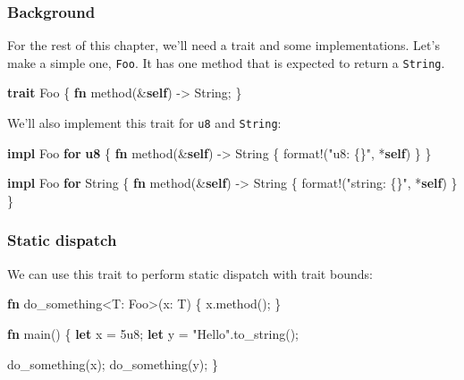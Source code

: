 \documentclass[a4paper,]{book}
\newenvironment{Shaded}{\begin{snugshade}}{\end{snugshade}}
\newcommand{\KeywordTok}[1]{\textcolor[rgb]{0.13,0.29,0.53}{\textbf{{#1}}}}
\newcommand{\DecValTok}[1]{\textcolor[rgb]{0.00,0.00,0.81}{{#1}}}
\newcommand{\StringTok}[1]{\textcolor[rgb]{0.31,0.60,0.02}{{#1}}}
\newcommand{\OtherTok}[1]{\textcolor[rgb]{0.56,0.35,0.01}{{#1}}}
\newcommand{\NormalTok}[1]{{#1}}
\begin{document}
\subsubsection{Background}\label{background}

For the rest of this chapter, we'll need a trait and some
implementations. Let's make a simple one, \texttt{Foo}. It has one
method that is expected to return a \texttt{String}.

\begin{Shaded}
\begin{Highlighting}[]
\KeywordTok{trait} \NormalTok{Foo \{}
    \KeywordTok{fn} \NormalTok{method(&}\KeywordTok{self}\NormalTok{) -> String;}
\NormalTok{\}}
\end{Highlighting}
\end{Shaded}

We'll also implement this trait for \texttt{u8} and \texttt{String}:

\begin{Shaded}
\begin{Highlighting}[]
\KeywordTok{impl} \NormalTok{Foo }\KeywordTok{for} \KeywordTok{u8} \NormalTok{\{}
    \KeywordTok{fn} \NormalTok{method(&}\KeywordTok{self}\NormalTok{) -> String \{ }\OtherTok{format!}\NormalTok{(}\StringTok{"u8: \{\}"}\NormalTok{, *}\KeywordTok{self}\NormalTok{) \}}
\NormalTok{\}}

\KeywordTok{impl} \NormalTok{Foo }\KeywordTok{for} \NormalTok{String \{}
    \KeywordTok{fn} \NormalTok{method(&}\KeywordTok{self}\NormalTok{) -> String \{ }\OtherTok{format!}\NormalTok{(}\StringTok{"string: \{\}"}\NormalTok{, *}\KeywordTok{self}\NormalTok{) \}}
\NormalTok{\}}
\end{Highlighting}
\end{Shaded}

\subsubsection{Static dispatch}\label{static-dispatch}

We can use this trait to perform static dispatch with trait bounds:

\begin{Shaded}
\begin{Highlighting}[]
\KeywordTok{fn} \NormalTok{do_something<T: Foo>(x: T) \{}
    \NormalTok{x.method();}
\NormalTok{\}}

\KeywordTok{fn} \NormalTok{main() \{}
    \KeywordTok{let} \NormalTok{x = }\DecValTok{5u8}\NormalTok{;}
    \KeywordTok{let} \NormalTok{y = }\StringTok{"Hello"}\NormalTok{.to_string();}

    \NormalTok{do_something(x);}
    \NormalTok{do_something(y);}
\NormalTok{\}}
\end{Highlighting}
\end{Shaded}
\end{document}
